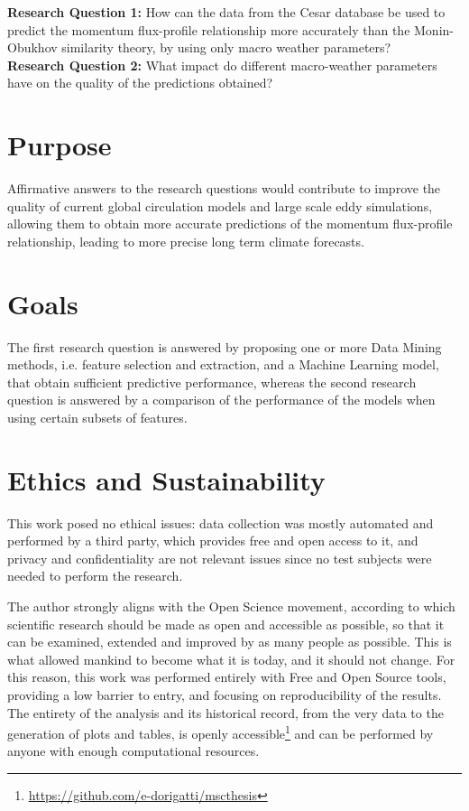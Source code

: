 \documentclass[a4paper]{book}
\begin{document}
\begin{tcolorbox}
\textbf{Research Question 1:} How can the data from the Cesar database be used to predict the momentum flux-profile relationship more accurately than the Monin-Obukhov similarity theory, by using only macro weather parameters? \\

\textbf{Research Question 2:} What impact do different macro-weather parameters have on the quality of the predictions obtained?
\end{tcolorbox}


\section{Purpose}
\label{sec:purpose}
Affirmative answers to the research questions would contribute to improve the quality of current global circulation models and large scale eddy simulations, allowing them to obtain more accurate predictions of the momentum flux-profile relationship, leading to more precise long term climate forecasts.


\section{Goals}
The first research question is answered by proposing one or more Data Mining methods, i.e. feature selection and extraction, and a Machine Learning model, that obtain sufficient predictive performance, whereas the second research question is answered by a comparison of the performance of the models when using certain subsets of features.


\section{Ethics and Sustainability}
\label{sec:ethics}
This work posed no ethical issues: data collection was mostly automated and performed by a third party, which provides free and open access to it, and privacy and confidentiality are not relevant issues since no test subjects were needed to perform the research.

The author strongly aligns with the Open Science movement, according to which scientific research should be made as open and accessible as possible, so that it can be examined, extended and improved by as many people as possible. This is what allowed mankind to become what it is today, and it should not change. For this reason, this work was performed entirely with Free and Open Source tools, providing a low barrier to entry, and focusing on reproducibility of the results. The entirety of the analysis and its historical record, from the very data to the generation of plots and tables, is openly accessible\footnote{\url{https://github.com/e-dorigatti/mscthesis}} and can be performed by anyone with enough computational resources.
\end{document}
